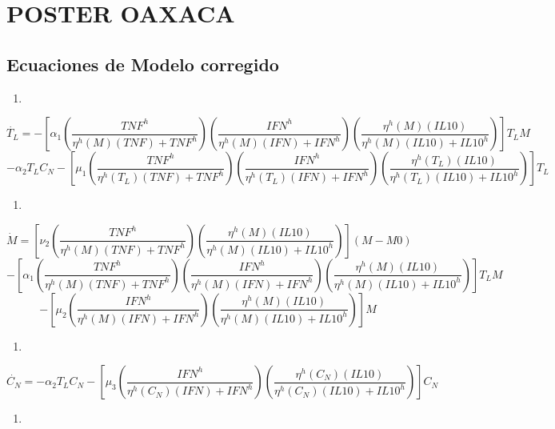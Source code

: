 \documentclass[
]{article}
\providecommand{\tightlist}{%
  \setlength{\itemsep}{0pt}\setlength{\parskip}{0pt}}
\begin{document}
\hypertarget{poster-oaxaca}{%
\section{POSTER OAXACA}\label{poster-oaxaca}}

\hypertarget{ecuaciones-de-modelo-corregido}{%
\subsection{Ecuaciones de Modelo
corregido}\label{ecuaciones-de-modelo-corregido}}

\begin{enumerate}
\def\labelenumi{\arabic{enumi}.}
\tightlist
\item
\end{enumerate}

\[ \dot{T_{L}}= - [\alpha_{1}(\dfrac{TNF^{h}}{\eta^{h}(M)(TNF)+ TNF^{h}})(\dfrac{IFN^{h}}{\eta^{h}(M)(IFN)+IFN^{h}})(\dfrac{\eta^{h}(M)(IL10)}{\eta^{h}(M)(IL10)+IL10^{h}})]T_{L}M  \]
\[-\alpha_{2}T_{L}C_{N}- [\mu_{1}(\dfrac{TNF^{h}}{\eta^{h}(T_{L})(TNF)+TNF^{h}})(\dfrac{IFN^{h}}{\eta^{h}(T_{L})(IFN)+IFN^{h}})(\dfrac{\eta^{h}(T_{L})(IL10)}{\eta^{h}(T_{L})(IL10)+IL10^{h}})]T_{L} \]

\begin{enumerate}
\def\labelenumi{\arabic{enumi}.}
\setcounter{enumi}{1}
\tightlist
\item
\end{enumerate}

\[ \dot{M}= [\nu_{2}(\dfrac{TNF^{h}}{\eta^{h}(M)(TNF)+TNF^{h}})(\dfrac{\eta^{h}(M)(IL10)}{\eta^{h}(M)(IL10)+IL10^{h}})](M-M0)\]
\[-[\alpha_{1}(\dfrac{TNF^{h}}{\eta^{h}(M)(TNF)+ TNF^{h}})(\dfrac{IFN^{h}}{\eta^{h}(M)(IFN)+IFN^{h}})(\dfrac{\eta^{h}(M)(IL10)}{\eta^{h}(M)(IL10)+IL10^{h}})]T_{L}M\]
\[-[\mu_{2}(\dfrac{IFN^{h}}{\eta^{h}(M)(IFN)+IFN^{h}})(\dfrac{\eta^{h}(M)(IL10)}{\eta^{h}(M)(IL10)+IL10^{h}})]M  \]

\begin{enumerate}
\def\labelenumi{\arabic{enumi}.}
\setcounter{enumi}{2}
\tightlist
\item
\end{enumerate}

\[ \dot{C_{N}}= -\alpha_{2}T_{L}C_{N}-[\mu_{3}(\dfrac{IFN^{h}}{\eta^{h}(C_{N})(IFN)+IFN^{h}})(\dfrac{\eta^{h}(C_{N})(IL10)}{\eta^{h}(C_{N})(IL10)+IL10^{h}})]C_{N} \]

\begin{enumerate}
\def\labelenumi{\arabic{enumi}.}
\setcounter{enumi}{3}
\tightlist
\item
\end{enumerate}
\end{document}
